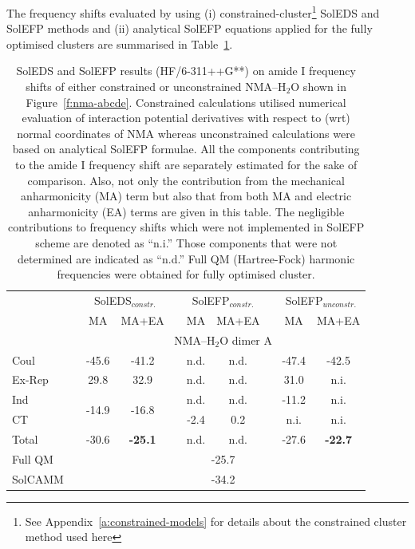 \documentclass[b5paper,oneside,fleqn,11pt]{book}
\begin{document}
\begin{refsection}
The frequency
shifts evaluated by using (i) constrained\hyp{}cluster\footnote{See Appendix~\ref{a:constrained-models} for details about
the constrained cluster method used here} SolEDS and
SolEFP methods and (ii) analytical SolEFP equations applied
for the fully optimised clusters are summarised in Table~\ref{t:amide-I-soleds-solefp}.
%
\begin{table}[t!]
\caption{
SolEDS and SolEFP results (HF/6-311++G**) 
on amide I frequency shifts of either constrained or unconstrained NMA--H$_2$O%
shown in Figure~\ref{f:nma-abcde}. 
Constrained calculations
utilised numerical evaluation of interaction potential derivatives with respect to (wrt) normal coordinates of NMA whereas unconstrained calculations were
based on analytical SolEFP formulae. All the components contributing to the amide I frequency shift are separately
estimated for the sake of comparison. Also, not only the contribution from the mechanical anharmonicity (MA) term but also that from both MA and electric
anharmonicity (EA) terms are given in this table. The negligible contributions to frequency shifts which were not implemented in SolEFP scheme are denoted
as “n.i.” Those components that were not determined are indicated
as “n.d.” Full QM (Hartree-Fock) harmonic frequencies were obtained for fully optimised cluster.
\label{t:amide-I-soleds-solefp}}
\begin{tabular*}{1.0\textwidth}{@{\extracolsep{\fill} } l ccccccccc }
\hline\hline
 && \multicolumn{2}{c}{SolEDS$_{constr.}$} && \multicolumn{2}{c}{SolEFP$_{constr.}$} && \multicolumn{2}{c}{SolEFP$_{unconstr.}$} \\
\cline{3-4}
\cline{6-7}
\cline{9-10}
 && MA & MA+EA && MA & MA+EA && MA & MA+EA \\
\hline
 && \multicolumn{8}{c}{NMA--H$_2$O dimer A} \\
\cline{3-10}
Coul   && -45.6 & -41.2 &&  n.d. & n.d. && -47.4 & -42.5 \\
Ex-Rep &&  29.8 &  32.9 &&  n.d. & n.d. &&  31.0 &  n.i. \\
Ind    &&  \multirow{2}{*}{-14.9}& \multirow{2}{*}{-16.8} && n.d. & n.d. && -11.2 & n.i. \\
CT     &&       &       && -2.4  & 0.2  &&  n.i. &  n.i. \\
Total  && -30.6 & \bf{-25.1} &&  n.d. & n.d. && -27.6 & \bf{-22.7} \\
Full QM&& \multicolumn{8}{c}{-25.7} \\
SolCAMM&& \multicolumn{8}{c}{-34.2} \\

\end{tabular*}
\end{table}
\end{refsection}
\end{document}
